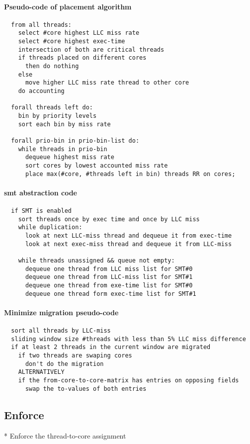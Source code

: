   \paragraph{Pseudo-code of placement algorithm}
  \begin{verbatim}
  from all threads:
    select #core highest LLC miss rate
    select #core highest exec-time
    intersection of both are critical threads
    if threads placed on different cores
      then do nothing
    else
      move higher LLC miss rate thread to other core
    do accounting

  forall threads left do:
    bin by priority levels
    sort each bin by miss rate

  forall prio-bin in prio-bin-list do:
    while threads in prio-bin
      dequeue highest miss rate
      sort cores by lowest accounted miss rate
      place max(#core, #threads left in bin) threads RR on cores;
  \end{verbatim}

  \paragraph{\gls{smt} abstraction code}
  \begin{verbatim}
  if SMT is enabled
    sort threads once by exec time and once by LLC miss
    while duplication:
      look at next LLC-miss thread and dequeue it from exec-time
      look at next exec-miss thread and dequeue it from LLC-miss

    while threads unassigned && queue not empty:
      dequeue one thread from LLC miss list for SMT#0
      dequeue one thread from LLC-miss list for SMT#1
      dequeue one thread from exe-time list for SMT#0
      dequeue one thread form exec-time list for SMT#1
  \end{verbatim}

  \paragraph{Minimize migration pseudo-code}
  \begin{verbatim}
  sort all threads by LLC-miss
  sliding window size #threads with less than 5% LLC miss difference
  if at least 2 threads in the current window are migrated
    if two threads are swaping cores
      don't do the migration
    ALTERNATIVELY
    if the from-core-to-core-matrix has entries on opposing fields
      swap the to-values of both entries
  \end{verbatim}

\subsection{Enforce}

  * Enforce the thread-to-core assignment


